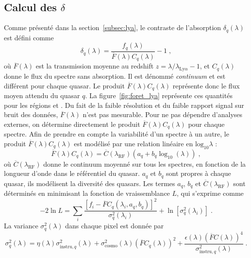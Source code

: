 \documentclass[11pt, twoside, a4paper, openright]{report}
\begin{document}
\subsection{Calcul des $\delta$}
\label{subsec:calcul_delta}
Comme présenté dans la section~\ref{subsec:lya}, le contraste de l'absorption \lya{} $\delta_q(\lambda)$ est défini comme
\begin{equation}
  \label{eq:deltaF}
  \delta_q(\lambda) = \frac{f_q(\lambda)}{\overline F(\lambda) C_q(\lambda)} - 1 \;,
\end{equation}
où $\overline F(\lambda)$ est la transmission moyenne au redshift $z = \lambda / \lambda_{\mathrm{Ly}\alpha} - 1$, et $C_q(\lambda)$ donne le flux du spectre sans absorption. Il est dénommé \emph{continuum} et est différent pour chaque quasar.
Le produit $\overline F(\lambda) C_q(\lambda)$ représente donc le flux moyen attendu du quasar $q$.
La figure~\ref{fig:foret_lya} représente ces quantités pour les régions \lya{} et \lyb{}.
Du fait de la faible résolution et du faible rapport signal sur bruit des données, $\overline F(\lambda)$ n'est pas mesurable. Pour ne pas dépendre d'analyses externes, on détermine directement le produit $\overline F(\lambda) C_q(\lambda)$ pour chaque spectre.
Afin de prendre en compte la variabilité d'un spectre à un autre, le produit $\overline F(\lambda) C_q(\lambda)$ est modélisé par une relation linéaire en $\mathrm{log}_{10} \lambda$ :
\begin{equation}
  \label{eq:diversity}
  \overline F(\lambda) C_q(\lambda) = \overline C(\lambda_{\mathrm{RF}})(a_q + b_q \log_{10}(\lambda)) \; ,
\end{equation}
où $\overline C(\lambda_{\mathrm{RF}})$ donne le continuum moyenné sur tous les spectres, en fonction de la longueur d'onde dans le référentiel du quasar. $a_q$ et $b_q$ sont propres à chaque quasar, ils modélisent la diversité des quasars.
Les termes $a_q$, $b_q$ et $\overline C(\lambda_{\mathrm{RF}})$ sont déterminés en minimisant la fonction de vraissemblance $L$, qui s'exprime comme
\begin{equation}
  \label{eq:likelihood}
  - 2 \ln L = \sum\limits_{i} \frac{\left[f_{i} - \overline F C_q(\lambda_{i}, a_q, b_q)\right]^2}{\sigma_q^2 (\lambda_i)} + \ln [\sigma_q^2 (\lambda_i)] \;  .
\end{equation}
La variance $\sigma_q^2(\lambda)$ dans chaque pixel est donnée par
\begin{equation}
  \label{eq:variance}
  \sigma_q^2(\lambda) = \eta(\lambda) \sigma_{\mathrm{instru}, q}^2(\lambda) + \sigma_{\mathrm{cosmo}}^2 (\lambda) (\overline F C_q(\lambda))^2 + \frac{\epsilon(\lambda)(\overline F C(\lambda))^4}{\sigma_{\mathrm{instru},q}^2 (\lambda)}  \; .
\end{equation}
\end{document}
